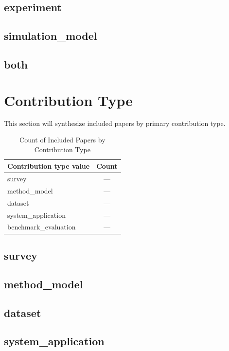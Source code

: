 \documentclass[lettersize,journal]{IEEEtran}
\begin{document}
\subsection{experiment}

\subsection{simulation\_model}

\subsection{both}


\section{Contribution Type}
This section will synthesize included papers by primary contribution type.

\begin{table}[H]
\caption{Count of Included Papers by Contribution Type}
\label{tab:contribution_type_counts}
\centering
\begin{tabular}{|l|c|}
\hline
Contribution type value & Count\\
\hline
survey & ---\\
method\_model & ---\\
dataset & ---\\
system\_application & ---\\
benchmark\_evaluation & ---\\
\hline
\end{tabular}
\end{table}

\subsection{survey}

\subsection{method\_model}

\subsection{dataset}

\subsection{system\_application}
\end{document}

